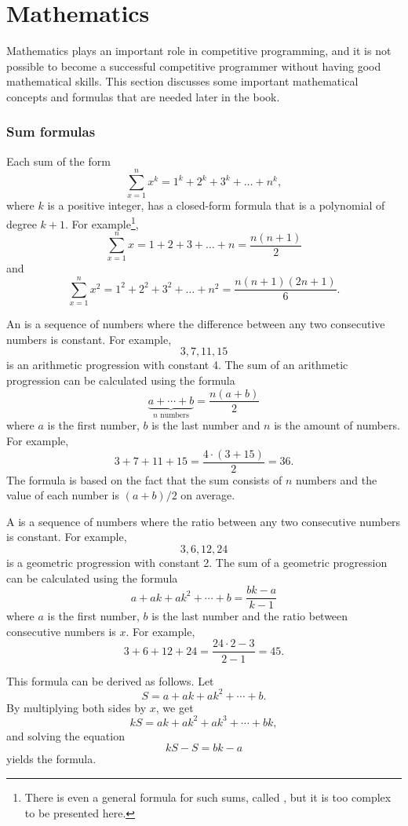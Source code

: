 \section{Mathematics}

Mathematics plays an important role in competitive
programming, and it is not possible to become
a successful competitive programmer without
having good mathematical skills.
This section discusses some important
mathematical concepts and formulas that
are needed later in the book.

\subsubsection{Sum formulas}

Each sum of the form
\[\sum_{x=1}^n x^k = 1^k+2^k+3^k+\ldots+n^k,\]
where $k$ is a positive integer,
has a closed-form formula that is a
polynomial of degree $k+1$.
For example\footnote{
There is even a general formula for such sums, called ,
but it is too complex to be presented here.},
\[\sum_{x=1}^n x = 1+2+3+\ldots+n = \frac{n(n+1)}{2}\]
and
\[\sum_{x=1}^n x^2 = 1^2+2^2+3^2+\ldots+n^2 = \frac{n(n+1)(2n+1)}{6}.\]

An  is a 
sequence of numbers
where the difference between any two consecutive
numbers is constant.
For example,
\[3, 7, 11, 15\]
is an arithmetic progression with constant 4.
The sum of an arithmetic progression can be calculated
using the formula
\[\underbrace{a + \cdots + b}_{n \,\, \textrm{numbers}} = \frac{n(a+b)}{2}\]
where $a$ is the first number,
$b$ is the last number and
$n$ is the amount of numbers.
For example,
\[3+7+11+15=\frac{4 \cdot (3+15)}{2} = 36.\]
The formula is based on the fact
that the sum consists of $n$ numbers and
the value of each number is $(a+b)/2$ on average.

A  is a sequence
of numbers
where the ratio between any two consecutive
numbers is constant.
For example,
\[3,6,12,24\]
is a geometric progression with constant 2.
The sum of a geometric progression can be calculated
using the formula
\[a + ak + ak^2 + \cdots + b = \frac{bk-a}{k-1}\]
where $a$ is the first number,
$b$ is the last number and the
ratio between consecutive numbers is $x$.
For example,
\[3+6+12+24=\frac{24 \cdot 2 - 3}{2-1} = 45.\]

This formula can be derived as follows. Let
\[ S = a + ak + ak^2 + \cdots + b .\]
By multiplying both sides by $x$, we get
\[ kS = ak + ak^2 + ak^3 + \cdots + bk,\]
and solving the equation
\[ kS-S = bk-a\]
yields the formula.

